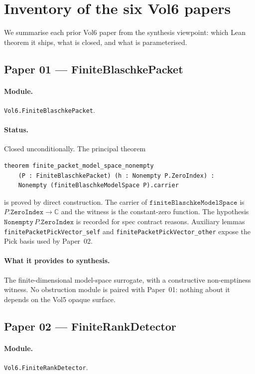 \documentclass[11pt]{article}
\theoremstyle{plain}
\theoremstyle{definition}
\theoremstyle{remark}
\newcommand{\C}{\mathbb{C}}
\newcommand{\code}[1]{\texttt{#1}}
\begin{document}
\section{Inventory of the six Vol6 papers}
\label{sec:inventory}

We summarise each prior Vol6 paper from the synthesis viewpoint:
which Lean theorem it ships, what is closed, and what is
parameterised.

\subsection{Paper 01 --- FiniteBlaschkePacket}
\label{sec:p01}

\paragraph{Module.}
\code{Vol6.FiniteBlaschkePacket}.

\paragraph{Status.}
Closed unconditionally. The principal theorem
\begin{lstlisting}
theorem finite_packet_model_space_nonempty
    (P : FiniteBlaschkePacket) (h : Nonempty P.ZeroIndex) :
    Nonempty (finiteBlaschkeModelSpace P).carrier
\end{lstlisting}
is proved by direct construction. The carrier of
\(\code{finiteBlaschkeModelSpace}\) is \(P.\code{ZeroIndex} \to \C\)
and the witness is the constant-zero function. The hypothesis
\(\code{Nonempty}\,P.\code{ZeroIndex}\) is recorded for spec
contract reasons. Auxiliary lemmas
\code{finitePacketPickVector\_self} and \code{finitePacketPickVector\_other}
expose the Pick basis used by Paper~02.

\paragraph{What it provides to synthesis.}
The finite-dimensional model-space surrogate, with a constructive
non-emptiness witness.  No obstruction module is paired with Paper~01:
nothing about it depends on the Vol5 opaque surface.

\subsection{Paper 02 --- FiniteRankDetector}
\label{sec:p02}

\paragraph{Module.}
\code{Vol6.FiniteRankDetector}.
\end{document}
